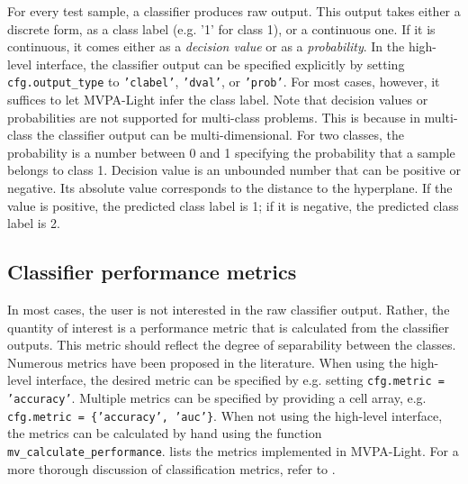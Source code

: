 \documentclass[utf8]{frontiersSCNS} %
\newcommand{\ttt}[1]{\texttt{#1}}
\begin{document}
For every test sample, a classifier produces raw output. This output takes either a discrete form, as a class label (e.g. '1' for class 1), or a continuous one. If it is continuous, it comes either as a \textit{decision value} or as a \textit{probability}.
In the high-level interface, the classifier output can be specified explicitly by setting \ttt{cfg.output\_type} to \ttt{'clabel'}, \ttt{'dval'}, or \ttt{'prob'}. For most cases, however, it suffices to let MVPA-Light infer the class label. Note that decision values or probabilities are not supported for multi-class problems. This is because in multi-class the classifier output can be multi-dimensional. For two classes, the probability is a number between 0 and 1 specifying the probability that a sample belongs to class 1. Decision value is an unbounded number that can be positive or negative. Its absolute value corresponds to the distance to the hyperplane.
 If the value is positive, the predicted class label is 1; if it is negative, the predicted class label is 2.

\subsection{Classifier performance metrics}\label{sec:metrics}

In most cases, the user is not interested in the raw classifier output. Rather, the quantity of interest is a performance metric that is calculated from the classifier outputs.
This metric should reflect the degree of separability between the classes. Numerous metrics have been proposed in the literature.  When using the high-level interface, the desired metric can be specified by e.g. setting \ttt{cfg.metric = 'accuracy'}. Multiple metrics can be specified by providing a cell array, e.g. \ttt{cfg.metric = \{'accuracy', 'auc'\}}. When not using the high-level interface, the metrics can be calculated by hand using the function \ttt{mv\_calculate\_performance}.  lists the metrics implemented in MVPA-Light. For a more thorough discussion of classification metrics, refer to  \cite{Sokolova2009ATasks}.
\end{document}
